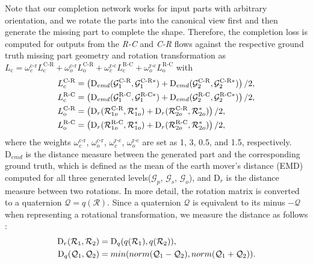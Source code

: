 Note that our completion network works for input parts with arbitrary orientation, and we rotate the parts into the canonical view first and then generate the missing part to complete the shape. Therefore, the completion loss is computed for outputs from the \textit{R-C} and \textit{C-R} flows against the respective ground truth missing part geometry and rotation transformation as $L_{\text{c}} = \omega_c^{\text{c-r}}L_{\text{c}}^{\text{C-R}} + \omega_o^{\text{c-r}}L_{\text{o}}^{\text{C-R}} + \omega_c^{\text{r-c}}L_{\text{c}}^{\text{R-C}} + \omega_o^{\text{r-c}}L_{\text{o}}^{\text{R-C}} $ with 
\begin{align}
L_{\text{c}}^{\text{C-R}} &= \left(\text{D}_{emd}(\mathcal{G}_1^{\text{C-R}} , \mathcal{G}_1^{\text{C-R}*}) + \text{D}_{emd}(\mathcal{G}_2^{\text{C-R}} , \mathcal{G}_2^{\text{C-R}*})\right) / 2, 
\notag \\ 
L_{\text{c}}^{\text{R-C}} &= \left(\text{D}_{emd}(\mathcal{G}_1^{\text{R-C}} , \mathcal{G}_1^{\text{R-C}*} ) + \text{D}_{emd}(\mathcal{G}_2^{\text{R-C}}, \mathcal{G}_2^{\text{R-C}*})\right) / 2,
\notag \\ 
L_{\text{o}}^{\text{C-R}} &= \left(\text{D}_r(\mathcal{R}_{1o}^{\text{C-R}} , \mathcal{R}_{1o}^{*}) + \text{D}_r(\mathcal{R}_{2o}^{\text{C-R}} , \mathcal{R}_{2o}^{*})\right) / 2,
\notag \\ 
L_{\text{o}}^{\text{R-C}} &= \left(\text{D}_r(\mathcal{R}_{1o}^{\text{R-C}} , \mathcal{R}_{1o}^{*}) + \text{D}_r(\mathcal{R}_{2o}^{\text{R-C}} , \mathcal{R}_{2o}^{*})\right) / 2,
\end{align}
where the weights $\omega_c^{\text{c-r}}$, $\omega_o^{\text{c-r}}$, $\omega_c^{\text{r-c}}$, $\omega_o^{\text{r-c}}$ are set as 1, 3, 0.5, and 1.5, respectively. $\text{D}_{emd}$ is the distance measure between the generated part and the corresponding ground truth, which is defined as the mean of the earth mover's distance (EMD)~\cite{liu2020morphing} computed for all three generated levels($\mathcal{G}_p$, $\mathcal{G}_s$, $\mathcal{G}_o$), and $\text{D}_r$ is the distance measure between two rotations. In more detail, the rotation matrix is converted to a quaternion $\mathcal{Q} = q(\mathcal{R})$. 
Since a quaternion $\mathcal{Q}$ is equivalent to its minus $-\mathcal{Q}$ when representing a rotational transformation, we measure the distance as follows :
\begin{align}
\text{D}_r(\mathcal{R}_1, \mathcal{R}_2) &= \text{D}_q(q(\mathcal{R}_1), q(\mathcal{R}_2)),
\notag \\ 
\text{D}_q(\mathcal{Q}_1, \mathcal{Q}_2) &= min(norm(\mathcal{Q}_1 - \mathcal{Q}_2), norm(\mathcal{Q}_1 + \mathcal{Q}_2)).
\end{align}


